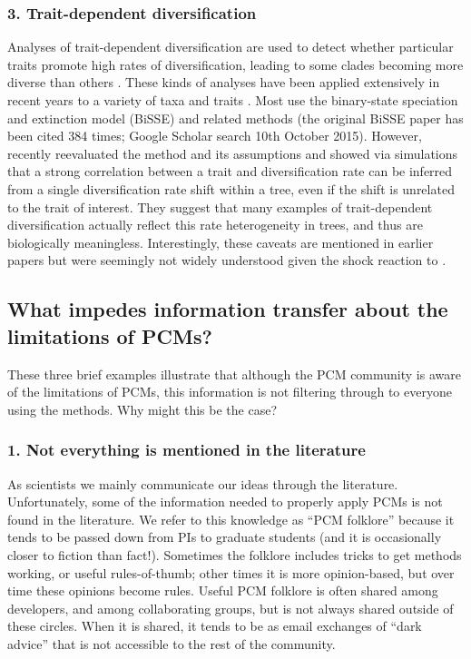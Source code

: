\documentclass[a4paper,12pt]{article}
\begin{document}
\subsubsection{3. Trait-dependent diversification} 
Analyses of trait-dependent diversification are used to detect whether particular traits promote high rates of diversification, leading to some clades becoming more diverse than others \citep{nee1994reconstructed}. 
These kinds of analyses have been applied extensively in recent years to a variety of taxa and traits \citep[e.g.][]{Goldberg22102010,Price01052012,Givnish201455,ELE:ELE12168}.
Most use the binary-state speciation and extinction model (BiSSE) and related methods (the original BiSSE paper \citet{maddison2007estimating} has been cited 384 times; Google Scholar search 10th October 2015).
However, \citet{rabosky2015model} recently reevaluated the method and its assumptions and showed via simulations that a strong correlation between a trait and diversification rate can be inferred from a single diversification rate shift within a tree, even if the shift is unrelated to the trait of interest.
They suggest that many examples of trait-dependent diversification actually reflect this rate heterogeneity in trees, and thus are biologically meaningless.
Interestingly, these caveats are mentioned in earlier papers \citep{maddison2007estimating,fitzjohn2010quantitative,FitzJohn:2012aa} but were seemingly not widely understood given the shock reaction to \citet{rabosky2015model}.

\subsection{What impedes information transfer about the limitations of PCMs?}
These three brief examples illustrate that although the PCM community is aware of the limitations of PCMs, this information is not filtering through to everyone using the methods. 
Why might this be the case?

  \subsubsection{1. Not everything is mentioned in the literature}
    As scientists we mainly communicate our ideas through the literature. 
    Unfortunately, some of the information needed to properly apply PCMs is not found in the literature. 
    We refer to this knowledge as ``PCM folklore'' because it tends to be passed down from PIs to graduate students (and it is occasionally closer to fiction than fact!).
    Sometimes the folklore includes tricks to get methods working, or useful rules-of-thumb; other times it is more opinion-based, but over time these opinions become rules. 
    Useful PCM folklore is often shared among developers, and among collaborating groups, but is not always shared outside of these circles. 
    When it is shared, it tends to be as email exchanges of ``dark advice'' that is not accessible to the rest of the community.
\end{document}
